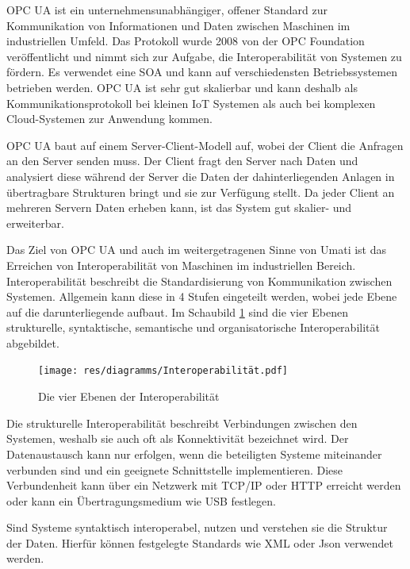 \documentclass[a4paper, 12pt, oneside, toc=listofnumbered, bibliography=totoc]{scrbook}
\begin{document}
	\ac{OPC UA} ist ein unternehmensunabhängiger, offener Standard zur Kommunikation von Informationen und Daten zwischen Maschinen im industriellen Umfeld. Das Protokoll wurde 2008 von der OPC Foundation veröffentlicht und nimmt sich zur Aufgabe, die Interoperabilität von Systemen zu fördern. Es verwendet eine \ac{SOA} und kann auf verschiedensten Betriebssystemen betrieben werden. OPC UA ist sehr gut skalierbar und kann deshalb als Kommunikationsprotokoll bei kleinen \ac{IoT} Systemen als auch bei komplexen Cloud-Systemen zur Anwendung kommen. 
	 
	OPC UA baut auf einem Server-Client-Modell auf, wobei der Client die Anfragen an den Server senden muss. Der Client fragt den Server nach Daten und analysiert diese während der Server die Daten der dahinterliegenden Anlagen in übertragbare Strukturen bringt und sie zur Verfügung stellt. Da jeder Client an mehreren Servern Daten erheben kann, ist das System gut skalier- und erweiterbar.
	
	Das Ziel von OPC UA und auch im weitergetragenen Sinne von \ac{Umati} ist das Erreichen von Interoperabilität von Maschinen im industriellen Bereich. Interoperabilität beschreibt die Standardisierung von Kommunikation zwischen Systemen. Allgemein kann diese in 4 Stufen eingeteilt werden, wobei jede Ebene auf die darunterliegende aufbaut. Im Schaubild \ref{fig:Interoperabilität} sind die vier Ebenen strukturelle, syntaktische, semantische und organisatorische Interoperabilität abgebildet.
	 
	 \begin{figure}[H]
	 	\centering
	 	\texttt{[image: res/diagramms/Interoperabilität.pdf]}
	 	\caption{Die vier Ebenen der Interoperabilität}
	 	\label{fig:Interoperabilität}
	 \end{figure}
	 
	 Die strukturelle Interoperabilität beschreibt Verbindungen zwischen den Systemen, weshalb sie auch oft als Konnektivität bezeichnet wird. Der Datenaustausch kann nur erfolgen, wenn die beteiligten Systeme miteinander verbunden sind und ein geeignete Schnittstelle implementieren. Diese Verbundenheit kann über ein Netzwerk mit TCP/IP oder HTTP erreicht werden oder kann ein Übertragungsmedium wie USB festlegen. \cite{mielebacher_verteilte_2021}
	 
	 Sind Systeme syntaktisch interoperabel, nutzen und verstehen sie die Struktur der Daten. Hierfür können festgelegte Standards wie XML oder Json verwendet werden. \cite{mielebacher_verteilte_2021-1}
	 
\end{document}
